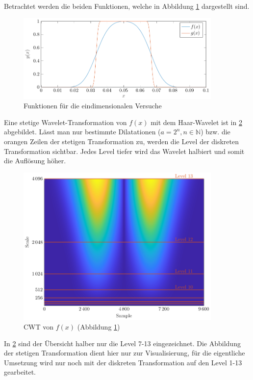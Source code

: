 Betrachtet werden die beiden Funktionen, welche in Abbildung \ref{deconvolve:1d} dargestellt sind.
\begin{figure}[h]
\centering
\includegraphics[width=0.9\textwidth]{./papers/deconvolve/pictures/1d.pdf}
\caption{Funktionen für die eindimensionalen Versuche\label{deconvolve:1d}}
\end{figure}
Eine stetige Wavelet-Transformation von $f(x)$ mit dem Haar-Wavelet ist in \ref{deconvolve:y1_cwt} abgebildet.
Lässt man nur bestimmte Dilatationen ($a=2^n, n\in \mathbb{N}$) bzw. die orangen \glqq Zeilen\grqq{} der stetigen Transformation zu, werden die Level der diskreten Transformation sichtbar.
Jedes Level tiefer wird das Wavelet \glqq halbiert\grqq{} und somit die Auflösung höher.

\begin{figure}[h]
\centering
\includegraphics[width=0.9\textwidth]{./papers/deconvolve/pictures/y1_cwt.pdf}
\caption{CWT von $f(x)$ (Abbildung \ref{deconvolve:1d})\label{deconvolve:y1_cwt}}
\end{figure}

In \ref{deconvolve:y1_cwt} sind der Übersicht halber nur die Level 7-13 eingezeichnet. 
Die Abbildung der stetigen Transformation dient hier nur zur Visualisierung, für die eigentliche Umsetzung wird nur noch mit der diskreten Transformation auf den Level 1-13 gearbeitet.

